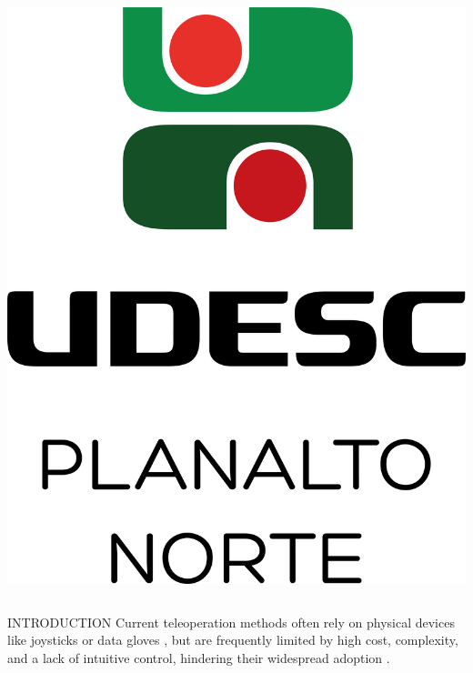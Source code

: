 \documentclass[%
  final,%
  english,%
  english,%
]{beamer}
\begin{document}
\begin{frame}[t, fragile = singleslide]
\begin{columns}[t, onlytextwidth]
\begin{column}{0.1\textwidth}
\begin{flushright}
\vspace*{0.5\baselineskip}
\includegraphics[width = \columnwidth]{./Logos/logo_planalto_norte.png}%
\end{flushright}
\end{column}
%
\end{columns}%

\begin{columns}[t, onlytextwidth]
%
\begin{column}{0.49\textwidth}
%
\begin{block}{INTRODUCTION}
Current teleoperation methods often rely on physical devices like joysticks or data gloves \cite{zick2024teleoperation,martinelli2020human}, but are frequently limited by high cost, complexity, and a lack of intuitive control, hindering their widespread adoption \cite{moniruzzaman2022teleoperation}.


\end{block}
\end{column}
\end{columns}
\end{frame}
\end{document}
